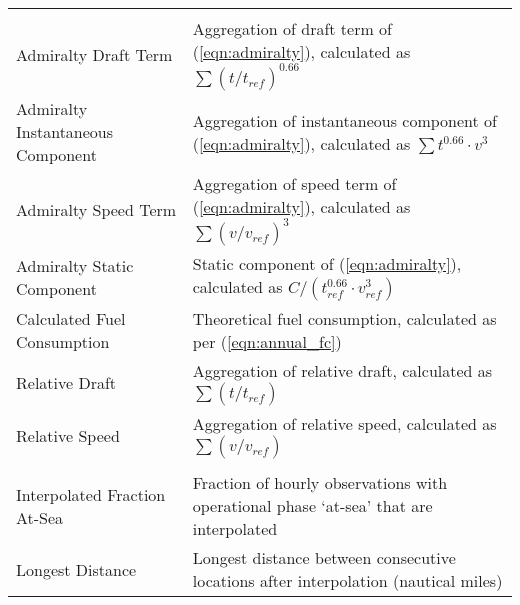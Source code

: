 \begin{tabular}[t]{>{\raggedright\arraybackslash}p{16em}>{\raggedright\arraybackslash}p{30em}}
\multicolumn{2}{l}{\textbf{Calculated}}\\
\hspace{1em}Admiralty Draft Term & Aggregation of draft term of (\ref{eqn:admiralty}), calculated as $\sum (t/t_{\textit{ref}})^{0.66}$\\
\hspace{1em}Admiralty Instantaneous Component & Aggregation of instantaneous component of (\ref{eqn:admiralty}), calculated as $\sum t^{0.66} \cdot v^3$\\
\hspace{1em}Admiralty Speed Term & Aggregation of speed term of (\ref{eqn:admiralty}), calculated as $\sum (v/v_{\textit{ref}})^{3}$\\
\hspace{1em}Admiralty Static Component & Static component of (\ref{eqn:admiralty}), calculated as $C / (t_{\textit{ref}}^{0.66} \cdot v_{\textit{ref}}^3)$\\
\hspace{1em}Calculated Fuel Consumption & Theoretical fuel consumption, calculated as per (\ref{eqn:annual_fc})\\
\hspace{1em}Relative Draft & Aggregation of relative draft, calculated as $\sum (t/t_{\textit{ref}})$\\
\hspace{1em}Relative Speed & Aggregation of relative speed, calculated as $\sum (v/v_{\textit{ref}})$\\
\addlinespace[0.3em]
\multicolumn{2}{l}{\textbf{Data Quality}}\\
\hspace{1em}Interpolated Fraction At-Sea & Fraction of hourly observations with operational phase ‘at-sea’ that are interpolated\\
\hspace{1em}Longest Distance & Longest distance between consecutive locations after interpolation (nautical miles)\\
\bottomrule
\end{tabular}
